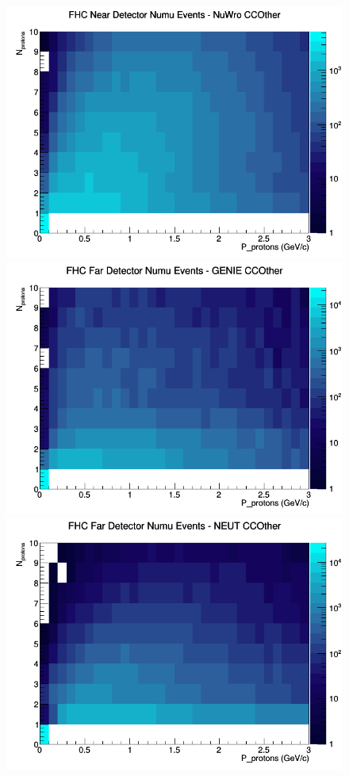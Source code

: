 \documentclass[12pt]{article}
\begin{document}
\begin{figure}[h]
\includegraphics[width=\linewidth]{N_P/nominal/protons/CCOther_FHC_ND_numu_N_P_NuWro.png}
\endminipage
\newline
{}
\includegraphics[width=\linewidth]{N_P/nominal/protons/CCOther_FHC_FD_numu_N_P_GENIE.png}
\endminipage
{}
\includegraphics[width=\linewidth]{N_P/nominal/protons/CCOther_FHC_FD_numu_N_P_NEUT.png}

\end{figure}
\end{document}
